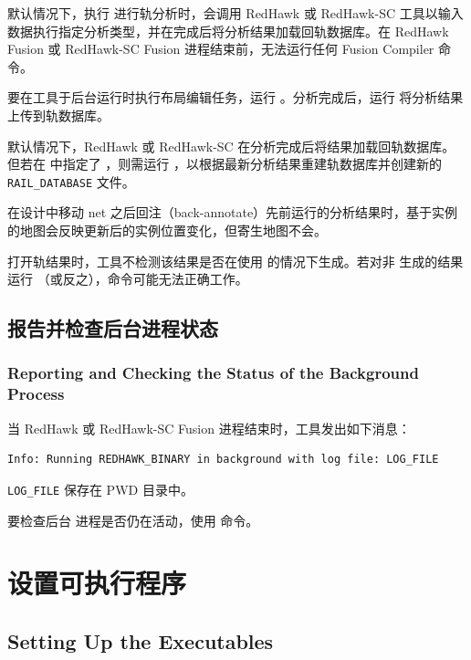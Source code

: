 默认情况下，执行  进行轨分析时，会调用 RedHawk 或 RedHawk-SC 工具以输入数据执行指定分析类型，并在完成后将分析结果加载回轨数据库。在 RedHawk Fusion 或 RedHawk-SC Fusion 进程结束前，无法运行任何 Fusion Compiler 命令。

要在工具于后台运行时执行布局编辑任务，运行  。分析完成后，运行   将分析结果上传到轨数据库。

默认情况下，RedHawk 或 RedHawk-SC 在分析完成后将结果加载回轨数据库。但若在  中指定了 ，则需运行  ，以根据最新分析结果重建轨数据库并创建新的 \texttt{RAIL\_DATABASE} 文件。

\begin{noteBox}
在设计中移动 net 之后回注（back-annotate）先前运行的分析结果时，基于实例的地图会反映更新后的实例位置变化，但寄生地图不会。

打开轨结果时，工具不检测该结果是否在使用  的情况下生成。若对非  生成的结果运行  （或反之），命令可能无法正确工作。
\end{noteBox}

\subsection{报告并检查后台进程状态}
\subsubsection*{Reporting and Checking the Status of the Background Process}

当 RedHawk 或 RedHawk-SC Fusion 进程结束时，工具发出如下消息：
\begin{lstlisting}
Info: Running REDHAWK_BINARY in background with log file: LOG_FILE
\end{lstlisting}
\texttt{LOG\_FILE} 保存在 PWD 目录中。

要检查后台  进程是否仍在活动，使用  命令。

\section{设置可执行程序}
\subsection*{Setting Up the Executables}

